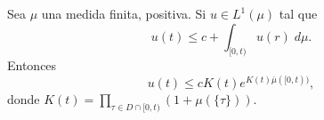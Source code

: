 \begin{thm} \label{TG} 	Sea $\mu$ una medida finita, positiva. Si $u\in L^1(\mu) $  tal que 
	\begin{equation*}
		u(t)\leq c+\int_{[0,t)}u(r) \; d\mu.
	\end{equation*} Entonces 
\begin{equation*}
	u(t)\leq c K(t)e^{K(t)\bar{\mu}([0,t))},
\end{equation*}
donde $K(t)=\displaystyle\prod_{\tau\in D\cap[0,t)}\left( 1+\mu(\{\tau\})\right) $.

\end{thm}



